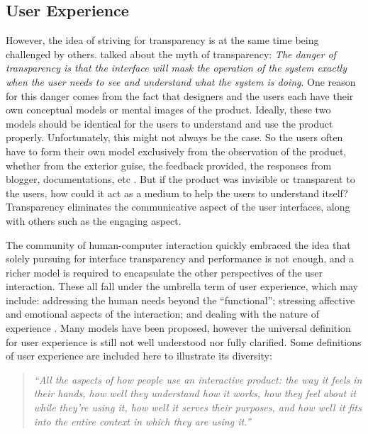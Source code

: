 \documentclass[a4paper,titlepage]{article}
\begin{document}
\subsection{User Experience}
However, the idea of striving for transparency is at the same time
being challenged by others. \citet{windows:bolter} talked about the
myth of transparency: \textit{The danger of transparency is that the
  interface will mask the operation of the system exactly when the
  user needs to see and understand what the system is doing}. One
reason for this danger comes from the fact that designers and the
users each have their own conceptual models or mental images of the
product. Ideally, these two models should be identical for the users
to understand and use the product properly. Unfortunately, this might
not always be the case. So the users often have to form their own
model exclusively from the observation of the product, whether from
the exterior guise, the feedback provided, the responses from blogger,
documentations, etc \citet{design:norman}. But if the product was
invisible or transparent to the users, how could it act as a medium to
help the users to understand itself? Transparency eliminates the
communicative aspect of the user interfaces, along with others such as
the engaging aspect.

The community of human-computer interaction quickly embraced the idea
that solely pursuing for interface transparency and performance is not
enough, and a richer model is required to encapsulate the other
perspectives of the user interaction. These all fall under the
umbrella term of user experience, which may include: addressing the
human needs beyond the ``functional''; stressing affective and
emotional aspects of the interaction; and dealing with the nature of
experience \citep{ux:hassenzahl}. Many models have been proposed,
however the universal definition for user experience is still not well
understood nor fully clarified. Some definitions of user experience
are included here to illustrate its diversity:
\begin{quote}
  {\it ``All the aspects of how people use an interactive product: the
    way it feels in their hands, how well they understand how it
    works, how they feel about it while they're using it, how well it
    serves their purposes, and how well it fits into the entire
    context in which they are using it.''}

  \raggedleft \citet{experience:alben}
\end{quote}
\end{document}
